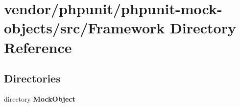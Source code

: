 \section{vendor/phpunit/phpunit-\/mock-\/objects/src/\+Framework Directory Reference}
\label{dir_9bacdd0bd85de7cd83c470f880e8e172}
\subsection*{Directories}
\begin{DoxyCompactItemize}
\item 
directory {\bf Mock\+Object}
\end{DoxyCompactItemize}
